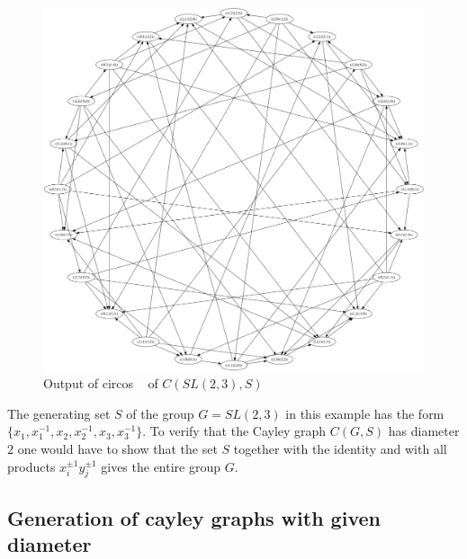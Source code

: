 \documentclass[a4paper,12pt,oneside]{report}%
\begin{document}
\begin{figure}[!ht]
	\centering
	\includegraphics[scale=0.25]{example.png}
	\caption{ Output of circos ~\cite{Circos} of $C(SL(2,3), S)$ }
\end{figure}

The generating set $S$ of the group $G=SL(2,3)$ in this example has the form $\{ x_1,x_1^{-1},x_2,x_2^{-1},x_3,x_3^{-1}\}$. To verify that the Cayley graph $C(G,S)$ has diameter $2$ one would have to show that the set $S$ together with the identity and with all products $x_i^{\pm 1}y_j^{\pm 1}$ gives the entire group $G$.

\lstset{
	basicstyle=\footnotesize,
	tabsize=2
}

\subsection{Generation of cayley graphs with given diameter}
\end{document}
